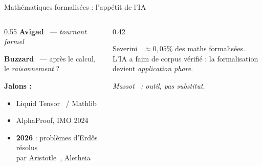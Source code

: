 \documentclass[aspectratio=169]{beamer}
\begin{document}
\begin{frame}{Mathématiques formalisées : l'appétit de l'IA}
  \begin{columns}
    \begin{column}{0.55\textwidth}
      \textbf{Avigad}~\cite{avigadMathematicsFormalTurn2023} — \emph{tournant formel}
      \smallskip

      \textbf{Buzzard}~\cite{buzzardMathematicalReasoningComputer2025,leanlearningseminarProfessorKevinBuzzard2025} —
      après le calcul, le \emph{raisonnement} ?
      \medskip

      \textbf{Jalons :}
      \begin{itemize}
        \item Liquid Tensor~\cite{scholze2021liquid} / Mathlib
        \item AlphaProof, IMO 2024~\cite{alphaproof2024}
        \item \textbf{2026} : problèmes d'Erd\H{o}s~\cite{erdosproblems} résolus\\
          par Aristotle~\cite{aristotle2026erdos728}, Aletheia~\cite{deepmind2026aletheia}
      \end{itemize}
    \end{column}
    \begin{column}{0.42\textwidth}
      \begin{alertblock}{Severini~\cite{severini2026infrastructure}}
        \small
        $\approx 0{,}05\%$ des maths formalisées.\\
        L'IA a faim de corpus vérifié : la formalisation devient \emph{application phare}.
      \end{alertblock}
      \medskip
      \small\emph{Massot~\cite{massotWhyFormalizeMathematics} : outil, pas substitut.}
    \end{column}
  \end{columns}
\end{frame}
\end{document}
